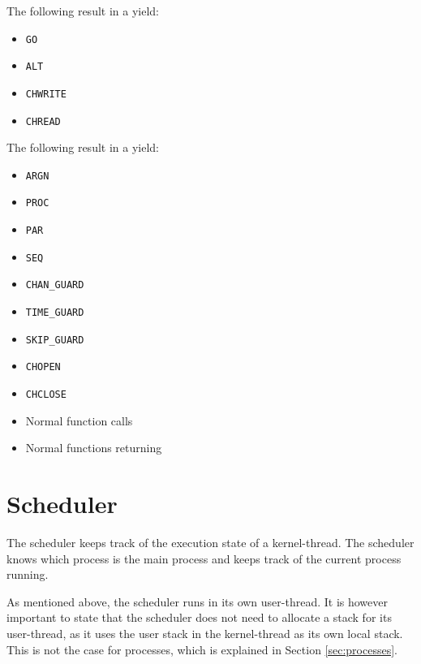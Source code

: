 The following \underline{} result in a yield:

\begin{multicols}{2}
\begin{itemize}[topsep=0em,itemsep=-1em,partopsep=0.5em,parsep=1em]
    \item \texttt{GO}
    \item \texttt{ALT}
    \item \texttt{CHWRITE}
    \item \texttt{CHREAD}
\end{itemize}
\end{multicols}

The following \underline{} result in a yield:

\begin{multicols}{2}
\begin{itemize}[topsep=0em,itemsep=-1em,partopsep=0.5em,parsep=1em]
    \item \texttt{ARGN}
    \item \texttt{PROC}
    \item \texttt{PAR}
    \item \texttt{SEQ}
    \item \texttt{CHAN\_GUARD}
    \item \texttt{TIME\_GUARD}
    \item \texttt{SKIP\_GUARD}
    \item \texttt{CHOPEN}
    \item \texttt{CHCLOSE}
    \item Normal function calls
    \item Normal functions returning
\end{itemize}
\end{multicols}


\section{Scheduler}
\label{sec:scheduler}

The scheduler keeps track of the execution state of a kernel\hyp{}thread. The scheduler knows which process is the main process and keeps track of the current process running. 

As mentioned above, the scheduler runs in its own user\hyp{}thread. It is however important to state that the scheduler does not need to allocate a stack for its user\hyp{}thread, as it uses the user stack in the kernel\hyp{}thread as its own local stack. This is not the case for processes, which is explained in Section \ref{sec:processes}.

